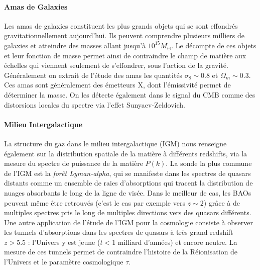 \paragraph{Amas de Galaxies}
Les amas de galaxies constituent les plus grands objets qui se sont effondrés gravitationnellement aujourd'hui. Ils peuvent comprendre plusieurs milliers de galaxies et atteindre des masses allant jusqu'à $10^{15} M_\odot$. Le décompte de ces objets et leur fonction de masse permet ainsi de contraindre le champ de matière aux échelles qui viennent seulement de s'effondrer, sous l'action de la gravité. Généralement on extrait de l'étude des amas les quantités $\sigma_8\sim 0.8$ et $\Omega_m\sim0.3$. Ces amas sont généralement des émetteurs X, dont l'émissivité permet de déterminer la masse. On les détecte également dans le signal du CMB comme des distorsions locales du spectre via l'effet Sunyaev-Zeldovich.

\paragraph{Milieu Intergalactique}
La structure du gaz dans le milieu intergalactique (IGM) nous renseigne également sur la distribution spatiale de la matière à différents redshifts, via la mesure du spectre de puissance de la matière $P(k)$. La sonde la plus commune de l'IGM est la \textit{forêt Lyman-alpha}, qui se manifeste dans les spectres de quasars distants comme un ensemble de raies d'absorptions qui tracent la distribution de nuages absorbants le long de la ligne de visée. Dans le meilleur de cas, les BAOs peuvent même être retrouvés (c'est le cas par exemple vers $z\sim2$) grâce à de multiples spectres pris le long de multiples directions vers des quasars différents. Une autre application de l'étude de l'IGM pour la cosmologie consiste à observer les tunnels d'absorptions dans les spectres de quasars à très grand redshift $z>5.5$ : l'Univers y est jeune ($t<1$ milliard d'années) et encore neutre. La mesure de ces tunnels permet de contraindre l'histoire de la Réionisation de l'Univers et le paramètre cosmologique $\tau$.

